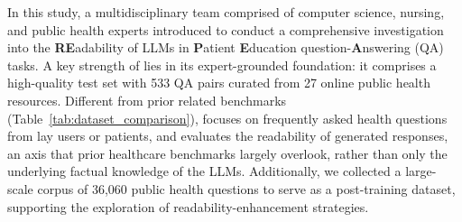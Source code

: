 In this study, a multidisciplinary team comprised of computer science, nursing, and public health experts introduced \textbf{\repqa} to conduct a comprehensive investigation into the \textbf{RE}adability of LLMs in \textbf{P}atient \textbf{E}ducation question-\textbf{A}nswering (QA) tasks.
A key strength of \repqa lies in its expert-grounded foundation: it comprises a high-quality test set with 533 QA pairs curated from 27 online public health resources.
Different from prior related benchmarks (Table~\ref{tab:dataset_comparison}), \repqa focuses on frequently asked health questions from lay users or patients, and evaluates the readability of generated responses, an axis that prior healthcare benchmarks largely overlook, rather than only the underlying factual knowledge of the LLMs.
Additionally, we collected a large-scale corpus of 36,060 public health questions to serve as a post-training dataset, supporting the exploration of readability-enhancement strategies.

